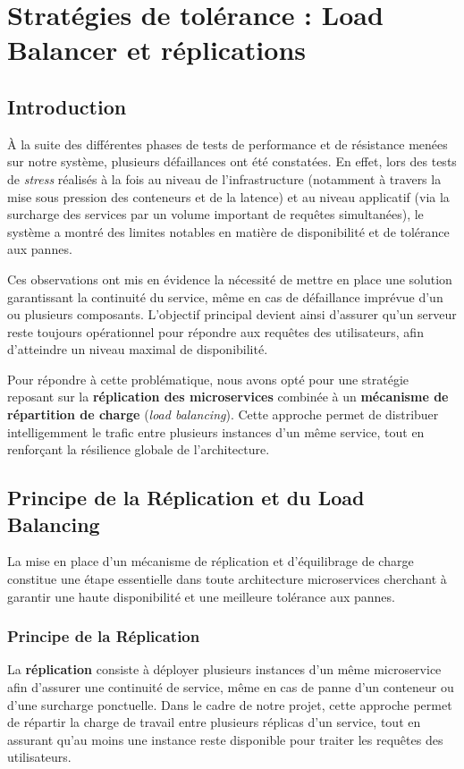 \chapter{Stratégies de tolérance : Load Balancer et réplications}

\section{Introduction}
À la suite des différentes phases de tests de performance et de résistance menées sur notre système, plusieurs défaillances ont été constatées. En effet, lors des tests de \textit{stress} réalisés à la fois au niveau de l'infrastructure (notamment à travers la mise sous pression des conteneurs et de la latence) et au niveau applicatif (via la surcharge des services par un volume important de requêtes simultanées), le système a montré des limites notables en matière de disponibilité et de tolérance aux pannes.

Ces observations ont mis en évidence la nécessité de mettre en place une solution garantissant la continuité du service, même en cas de défaillance imprévue d'un ou plusieurs composants. L'objectif principal devient ainsi d'assurer qu'un serveur reste toujours opérationnel pour répondre aux requêtes des utilisateurs, afin d'atteindre un niveau maximal de disponibilité.

Pour répondre à cette problématique, nous avons opté pour une stratégie reposant sur la \textbf{réplication des microservices} combinée à un \textbf{mécanisme de répartition de charge} (\textit{load balancing}). Cette approche permet de distribuer intelligemment le trafic entre plusieurs instances d'un même service, tout en renforçant la résilience globale de l'architecture.


\section{Principe de la Réplication et du Load Balancing}
La mise en place d'un mécanisme de réplication et d'équilibrage de charge constitue une étape essentielle dans toute architecture microservices cherchant à garantir une haute disponibilité et une meilleure tolérance aux pannes.  

\subsection{Principe de la Réplication}
La \textbf{réplication} consiste à déployer plusieurs instances d'un même microservice afin d'assurer une continuité de service, même en cas de panne d'un conteneur ou d'une surcharge ponctuelle.  
Dans le cadre de notre projet, cette approche permet de répartir la charge de travail entre plusieurs réplicas d'un service, tout en assurant qu'au moins une instance reste disponible pour traiter les requêtes des utilisateurs.

